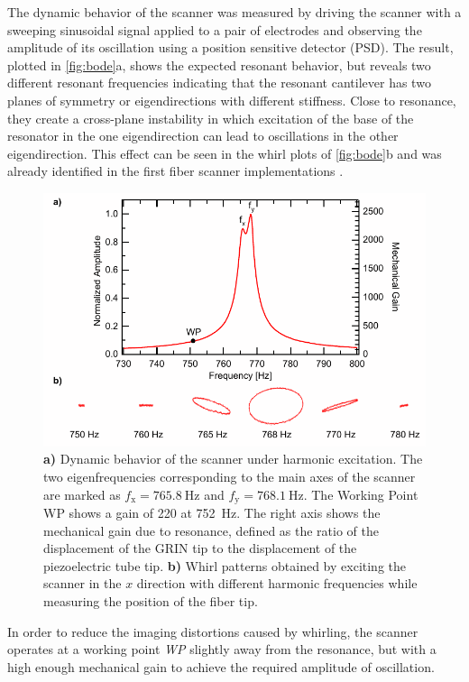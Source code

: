 \documentclass[10pt]{iopart}
\begin{document}
The dynamic behavior of the scanner was measured by driving the scanner with a sweeping sinusoidal signal applied to a pair of electrodes and observing the amplitude of its oscillation using a position sensitive detector (PSD). The result, plotted in \autoref{fig:bode}a, shows the expected resonant behavior, but reveals two different resonant frequencies indicating that the resonant cantilever has two planes of symmetry or eigendirections with different stiffness. Close to resonance, they create a cross-plane instability in which excitation of the base of the resonator in the one eigendirection can lead to oscillations in the other eigendirection. This effect can be seen in the whirl plots of \autoref{fig:bode}b and was already identified in the first fiber scanner implementations \cite{Seibel2001}.

\begin{figure}[h!]\centering \includegraphics[width=\columnwidth]{figures/bodeWhirl.pdf}
      \caption{\textbf{a)} Dynamic behavior of the scanner under harmonic excitation. The two eigenfrequencies corresponding to the main axes of the scanner are marked as $f_\mathrm{x} = \SI{765.8}{\hertz}$ and $f_\mathrm{y} = \SI{768.1}{\hertz}$.
      The Working Point WP shows a gain of 220 at \SI{752}{\hertz}. 
      The right axis shows the mechanical gain due to resonance, defined as the ratio of the displacement of the GRIN tip to the displacement of the piezoelectric tube tip.
      \textbf{b)} Whirl patterns obtained by exciting the scanner in the $x$ direction with different harmonic frequencies while measuring the position of the fiber tip. }
      \label{fig:bode}
\end{figure}

In order to reduce the imaging distortions caused by whirling, the scanner operates at a working point \textit{WP} slightly away from the resonance, but with a high enough mechanical gain to achieve the required amplitude of oscillation.
\end{document}
